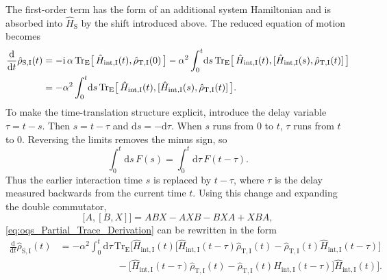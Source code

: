 The first-order term has the form of an additional system Hamiltonian and is absorbed into \(\hat{H}_{\mathrm{S}}\) by the shift introduced above. The reduced equation of motion becomes
\begin{align}
	\frac{\mathrm{d}}{\mathrm{d}t}\hat{\rho}_{\mathrm{S},\mathrm{I}}(t) & = -\mathrm{i} \, \alpha \, \mathrm{Tr}_{\mathrm{E}}\big[\,\hat{H}_{\mathrm{int},\mathrm{I}}(t),\hat{\rho}_{\mathrm{T},\mathrm{I}}(0)\,\big]
	- \alpha^2 \int_0^t\!\mathrm{d}s\, \mathrm{Tr}_{\mathrm{E}} \big[\,\hat{H}_{\mathrm{int},\mathrm{I}}(t), [\hat{H}_{\mathrm{int},\mathrm{I}}(s), \hat{\rho}_{\mathrm{T},\mathrm{I}}(t)] \,\big] \notag                               \\
	                                & = - \alpha^2 \int_0^t\!\mathrm{d}s\, \mathrm{Tr}_{\mathrm{E}} \big[\,\hat{H}_{\mathrm{int},\mathrm{I}}(t), [\hat{H}_{\mathrm{int},\mathrm{I}}(s), \hat{\rho}_{\mathrm{T},\mathrm{I}}(t)] \,\big].
	\label{eq:oqs_Partial_Trace_Derivation}
\end{align}
To make the time-translation structure explicit, introduce the delay variable
\(\tau = t-s\). Then \(s=t-\tau\) and \(\mathrm{d}s=-\mathrm{d}\tau\). When \(s\) runs from \(0\) to \(t\), \(\tau\) runs from \(t\) to \(0\). Reversing the limits removes the minus sign, so
\begin{equation*}
	\int_0^t\!\mathrm{d}s\,F(s)
	=
	\int_0^t\!\mathrm{d}\tau\,F(t-\tau).
\end{equation*}
Thus the earlier interaction time \(s\) is replaced by \(t-\tau\), where \(\tau\) is the delay measured backwards from the current time \(t\). Using this change and expanding the double commutator,
\begin{equation*}
	\big[ A, [B, X] \big] = A B X - A X B - B X A + X B A,
\end{equation*}
\autoref{eq:oqs_Partial_Trace_Derivation} can be rewritten in the form
\begin{align*}
	\frac{\mathrm{d}}{\mathrm{d}t}\hat{\rho}_{\mathrm{S},\mathrm{I}}(t) 
	&= -\alpha^2 \int_0^t\!\mathrm{d}\tau \, \mathrm{Tr}_{\mathrm{E}} \bigg[
	\hat{H}_{\mathrm{int},\mathrm{I}}(t) 
	\big[
	\hat{H}_{\mathrm{int},\mathrm{I}}(t-\tau) \hat{\rho}_{\mathrm{T},\mathrm{I}}(t)
	- \hat{\rho}_{\mathrm{T},\mathrm{I}}(t) \hat{H}_{\mathrm{int},\mathrm{I}}(t-\tau)
	\big] \\
	&\qquad\qquad\qquad
	- \big[
	\hat{H}_{\mathrm{int},\mathrm{I}}(t-\tau) \hat{\rho}_{\mathrm{T},\mathrm{I}}(t)
	- \hat{\rho}_{\mathrm{T},\mathrm{I}}(t) \hat{H}_{\mathrm{int},\mathrm{I}}(t-\tau)
	\big]\hat{H}_{\mathrm{int},\mathrm{I}}(t)
	\bigg].
\end{align*}
